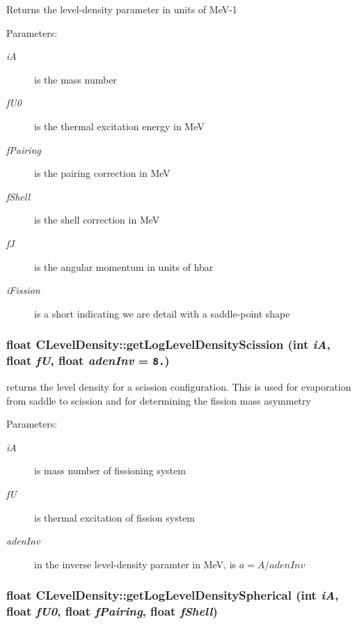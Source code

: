 Returns the level-density parameter in units of Me\-V-1 \begin{Desc}
\item[Parameters:]
\begin{description}
\item[{\em i\-A}]is the mass number \item[{\em f\-U0}]is the thermal excitation energy in Me\-V \item[{\em f\-Pairing}]is the pairing correction in Me\-V \item[{\em f\-Shell}]is the shell correction in Me\-V \item[{\em f\-J}]is the angular momentum in units of hbar \item[{\em i\-Fission}]is a short indicating we are detail with a saddle-point shape \end{description}
\end{Desc}
\subsubsection{\setlength{\rightskip}{0pt plus 5cm}float CLevel\-Density::get\-Log\-Level\-Density\-Scission (int {\em i\-A}, float {\em f\-U}, float {\em aden\-Inv} = {\tt 8.})}\label{classCLevelDensity_ad13f8bf607fc24ad3b1f3b6258a507b}


returns the level density for a scission configuration. This is used for evaporation from saddle to scission and for determining the fission mass asymmetry \begin{Desc}
\item[Parameters:]
\begin{description}
\item[{\em i\-A}]is mass number of fissioning system \item[{\em f\-U}]is thermal excitation of fission system \item[{\em aden\-Inv}]in the inverse level-density paramter in Me\-V, is $a=A/adenInv$ \end{description}
\end{Desc}
\subsubsection{\setlength{\rightskip}{0pt plus 5cm}float CLevel\-Density::get\-Log\-Level\-Density\-Spherical (int {\em i\-A}, float {\em f\-U0}, float {\em f\-Pairing}, float {\em f\-Shell})}\label{classCLevelDensity_f91006c52fab6772f9a98868cf03425c}


